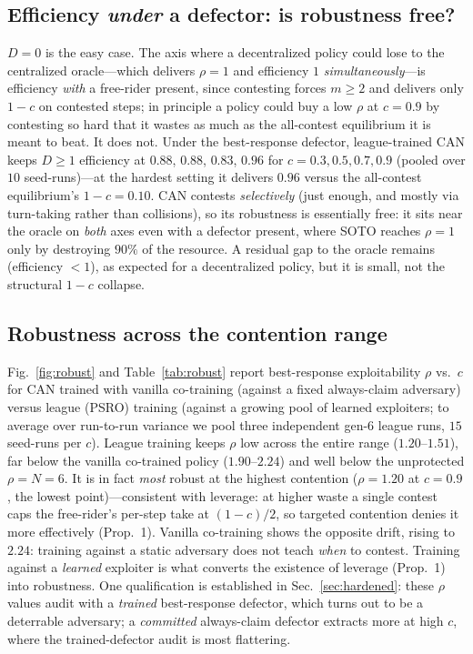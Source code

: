 \documentclass[conference, a4paper]{IEEEtran}
\begin{document}
\subsection{Efficiency \emph{under} a defector: is robustness free?}
$D{=}0$ is the easy case. The axis where a decentralized policy could lose to the
centralized oracle---which delivers $\rho{=}1$ and efficiency $1$
\emph{simultaneously}---is efficiency \emph{with} a free-rider present, since
contesting forces $m\ge2$ and delivers only $1{-}c$ on contested steps; in principle
a policy could buy a low $\rho$ at $c{=}0.9$ by contesting so hard that it wastes as
much as the all-contest equilibrium it is meant to beat. It does not. Under the
best-response defector, league-trained CAN keeps $D{\ge}1$ efficiency at $0.88$,
$0.88$, $0.83$, $0.96$ for $c{=}0.3,0.5,0.7,0.9$ (pooled over $10$ seed-runs)---at the
hardest setting it delivers $0.96$ versus the all-contest equilibrium's
$1{-}c{=}0.10$. CAN contests
\emph{selectively} (just enough, and mostly via turn-taking rather than collisions),
so its robustness is essentially free: it sits near the oracle on \emph{both} axes
even with a defector present, where SOTO reaches $\rho{=}1$ only by destroying $90\%$
of the resource. A residual gap to the oracle remains (efficiency $<1$), as expected
for a decentralized policy, but it is small, not the structural $1{-}c$ collapse.

\subsection{Robustness across the contention range}
Fig.~\ref{fig:robust} and Table~\ref{tab:robust} report best-response
exploitability $\rho$ vs.\ $c$ for CAN trained with vanilla co-training (against a
fixed always-claim adversary) versus league (PSRO) training (against a growing pool
of learned exploiters; to average over run-to-run variance we pool three independent
gen-6 league runs, $15$ seed-runs per $c$). League training keeps $\rho$ low across
the entire range ($1.20$--$1.51$), far below the vanilla co-trained policy
($1.90$--$2.24$) and well below the unprotected $\rho{=}N{=}6$. It is in fact
\emph{most} robust at the highest contention ($\rho{=}1.20$ at $c{=}0.9$, the lowest
point)---consistent with leverage: at higher waste a single contest caps the
free-rider's per-step take at $(1{-}c)/2$, so targeted contention denies it more
effectively (Prop.~1). Vanilla co-training shows the opposite drift, rising to
$2.24$: training against a static adversary does not teach \emph{when} to contest.
Training against a \emph{learned} exploiter is what converts the existence of
leverage (Prop.~1) into robustness. One qualification is established in
Sec.~\ref{sec:hardened}: these $\rho$ values audit with a \emph{trained}
best-response defector, which turns out to be a deterrable adversary; a
\emph{committed} always-claim defector extracts more at high $c$, where the
trained-defector audit is most flattering.
\end{document}
